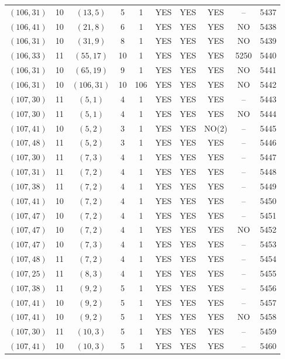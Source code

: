 \begin{longtable}{|c|c|c|c|c|c|c|c|c|c|}
$(106, 31)$ & 10 & $(13, 5)$ & 5 & 1 & YES & YES & YES & -- & 5437\\
$(106, 41)$ & 10 & $(21, 8)$ & 6 & 1 & YES & YES & YES & NO & 5438\\
$(106, 31)$ & 10 & $(31, 9)$ & 8 & 1 & YES & YES & YES & NO & 5439\\
$(106, 33)$ & 11 & $(55, 17)$ & 10 & 1 & YES & YES & YES & 5250 & 5440\\
$(106, 31)$ & 10 & $(65, 19)$ & 9 & 1 & YES & YES & YES & NO & 5441\\
$(106, 31)$ & 10 & $(106, 31)$ & 10 & 106 & YES & YES & YES & NO & 5442\\
$(107, 30)$ & 11 & $(5, 1)$ & 4 & 1 & YES & YES & YES & -- & 5443\\
$(107, 30)$ & 11 & $(5, 1)$ & 4 & 1 & YES & YES & YES & NO & 5444\\
$(107, 41)$ & 10 & $(5, 2)$ & 3 & 1 & YES & YES & NO(2) & -- & 5445\\
$(107, 48)$ & 11 & $(5, 2)$ & 3 & 1 & YES & YES & YES & -- & 5446\\
$(107, 30)$ & 11 & $(7, 3)$ & 4 & 1 & YES & YES & YES & -- & 5447\\
$(107, 31)$ & 11 & $(7, 2)$ & 4 & 1 & YES & YES & YES & -- & 5448\\
$(107, 38)$ & 11 & $(7, 2)$ & 4 & 1 & YES & YES & YES & -- & 5449\\
$(107, 41)$ & 10 & $(7, 2)$ & 4 & 1 & YES & YES & YES & -- & 5450\\
$(107, 47)$ & 10 & $(7, 2)$ & 4 & 1 & YES & YES & YES & -- & 5451\\
$(107, 47)$ & 10 & $(7, 2)$ & 4 & 1 & YES & YES & YES & NO & 5452\\
$(107, 47)$ & 10 & $(7, 3)$ & 4 & 1 & YES & YES & YES & -- & 5453\\
$(107, 48)$ & 11 & $(7, 2)$ & 4 & 1 & YES & YES & YES & -- & 5454\\
$(107, 25)$ & 11 & $(8, 3)$ & 4 & 1 & YES & YES & YES & -- & 5455\\
$(107, 38)$ & 11 & $(9, 2)$ & 5 & 1 & YES & YES & YES & -- & 5456\\
$(107, 41)$ & 10 & $(9, 2)$ & 5 & 1 & YES & YES & YES & -- & 5457\\
$(107, 41)$ & 10 & $(9, 2)$ & 5 & 1 & YES & YES & YES & NO & 5458\\
$(107, 30)$ & 11 & $(10, 3)$ & 5 & 1 & YES & YES & YES & -- & 5459\\
$(107, 41)$ & 10 & $(10, 3)$ & 5 & 1 & YES & YES & YES & -- & 5460\\

\end{longtable}
